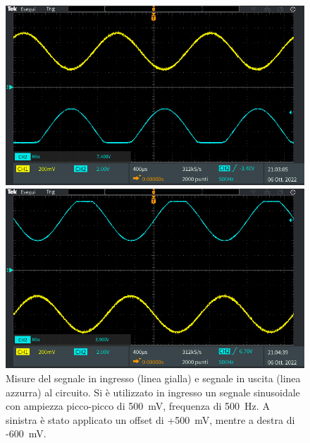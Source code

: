 \begin{figure}[h]
	\centering	
	\begin{minipage}{.45\textwidth}
		\includegraphics[width=\linewidth]{./ImageFiles/Laboratorio 1/TEK00019}
	\end{minipage}
	\qquad\qquad
	\begin{minipage}{.45\textwidth}
		\includegraphics[width=\linewidth]{./ImageFiles/Laboratorio 1/TEK00021}
	\end{minipage}
	
	\caption{Misure del segnale in ingresso (linea gialla) e segnale in uscita (linea azzurra) al circuito. Si è utilizzato in ingresso un segnale sinusoidale con ampiezza picco-picco di \SI{500}{\milli\volt}, frequenza di \SI{500}{\hertz}.  A sinistra è stato applicato un offset di +\SI{500}{\milli\volt}, mentre a destra di -\SI{600}{\milli\volt}.}
	\label{fig:misure_oscilloscopio_offset_sat}
\end{figure}
